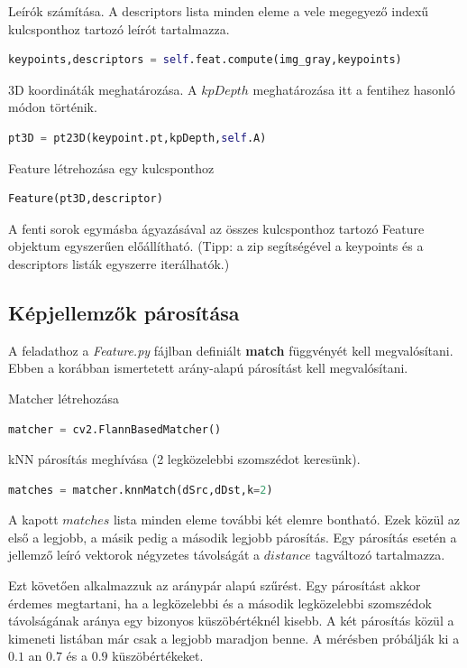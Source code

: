 \documentclass[12pt,a4paper,oneside]{report}             %
\begin{document}
Leírók számítása. A descriptors lista minden eleme a vele megegyező indexű kulcsponthoz tartozó leírót tartalmazza.

\begin{lstlisting}[language=Python]
keypoints,descriptors = self.feat.compute(img_gray,keypoints)
\end{lstlisting}

3D koordináták meghatározása. A $kpDepth$ meghatározása itt a fentihez hasonló módon történik.

\begin{lstlisting}[language=Python]
pt3D = pt23D(keypoint.pt,kpDepth,self.A)
\end{lstlisting}

Feature létrehozása egy kulcsponthoz

\begin{lstlisting}[language=Python]
Feature(pt3D,descriptor)
\end{lstlisting}

A fenti sorok egymásba ágyazásával az összes kulcsponthoz tartozó Feature objektum egyszerűen előállítható. (Tipp: a zip segítségével a keypoints és a descriptors listák egyszerre iterálhatók.)

\subsection{Képjellemzők párosítása}

A feladathoz a \emph{Feature.py} fájlban definiált \textbf{match} függvényét kell megvalósítani. Ebben a korábban ismertetett arány-alapú párosítást kell megvalósítani.

Matcher létrehozása

\begin{lstlisting}[language=Python]
matcher = cv2.FlannBasedMatcher()
\end{lstlisting}

kNN párosítás meghívása (2 legközelebbi szomszédot keresünk). 

\begin{lstlisting}[language=Python]
matches = matcher.knnMatch(dSrc,dDst,k=2)
\end{lstlisting}

A kapott $matches$ lista minden eleme további két elemre bontható. Ezek közül az első a legjobb, a másik pedig a második legjobb párosítás. Egy párosítás esetén a jellemző leíró vektorok négyzetes távolságát a $distance$ tagváltozó tartalmazza.

Ezt követően alkalmazzuk az aránypár alapú szűrést. Egy párosítást akkor érdemes megtartani, ha a legközelebbi és a második legközelebbi szomszédok távolságának aránya egy bizonyos küszöbértéknél kisebb. A két párosítás közül a kimeneti listában már csak a legjobb maradjon benne. A mérésben próbálják ki a $0.1$ an $0.7$ és a $0.9$ küszöbértékeket.
\end{document}
